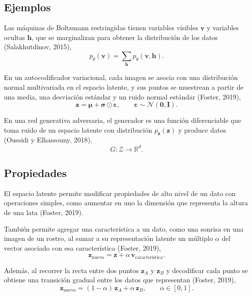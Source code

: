 \documentclass[11pt,letterpaper]{article}
\theoremstyle{definition}
\newcommand{\bz}{\mathbf{z}}
\newcommand{\bv}{\mathbf{v}}
\newcommand{\bh}{\mathbf{h}}
\newcommand{\ptheta}{p_{\theta}}
\newcommand{\normal}{\mathcal{N}}
\begin{document}
\subsection{Ejemplos}

Las máquinas de Boltzmann restringidas tienen variables visibles $\bv$ y variables ocultas $\bh$, que se marginalizan para obtener la distribución de los datos (Salakhutdinov, 2015),
\begin{equation}
  \ptheta(\bv) = \sum_{\bh} \ptheta(\bv, \bh).
\end{equation}

En un autocodificador variacional, cada imagen se asocia con una distribución normal multivariada en el espacio latente, y sus puntos se muestrean a partir de una media, una desviación estándar y un ruido normal estándar (Foster, 2019),
\begin{equation}
  \bz = \boldsymbol{\mu} + \boldsymbol{\sigma} \odot \boldsymbol{\varepsilon}, \qquad \boldsymbol{\varepsilon} \sim \normal(\mathbf{0}, \mathbf{I}).
\end{equation}

En una red generativa adversaria, el generador es una función diferenciable que toma ruido de un espacio latente con distribución $p_{\bz}(\bz)$ y produce datos (Oussidi y Elhassouny, 2018),
\begin{equation}
  G : \mathcal{Z} \to \mathbb{R}^{d}.
\end{equation}

\subsection{Propiedades}

El espacio latente permite modificar propiedades de alto nivel de un dato con operaciones simples, como aumentar en uno la dimensión que representa la altura de una lata (Foster, 2019).

También permite agregar una característica a un dato, como una sonrisa en una imagen de un rostro, al sumar a su representación latente un múltiplo $\alpha$ del vector asociado con esa característica (Foster, 2019),
\begin{equation}
  \bz_{\text{nuevo}} = \bz + \alpha\, \mathbf{v}_{\text{característica}}.
\end{equation}

Además, al recorrer la recta entre dos puntos $\bz_A$ y $\bz_B$ y decodificar cada punto se obtiene una transición gradual entre los datos que representan (Foster, 2019),
\begin{equation}
  \bz_{\text{nuevo}} = (1 - \alpha)\, \bz_A + \alpha\, \bz_B, \qquad \alpha \in [0, 1].
\end{equation}
\end{document}
